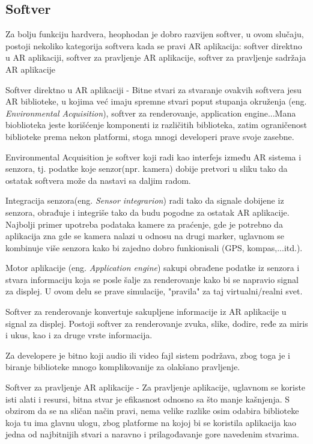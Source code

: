 \documentclass[a4paper]{article}
\begin{document}
	\subsection{Softver}
        \label{sec:Softver}
        Za bolju funkciju hardvera, heophodan je dobro razvijen softver, u ovom slučaju, postoji nekoliko kategorija softvera kada se pravi AR aplikacija: softver
	direktno u AR aplikaciji, softver za pravljenje AR aplikacije, softver za pravljenje sadržaja AR aplikacije
        
	Softver direktno u AR aplikaciji - Bitne stvari za stvaranje ovakvih softvera jesu AR biblioteke, u kojima već imaju spremne stvari poput stupanja okruženja
	(eng. \emph{Environmental Acquisition}), softver za renderovanje, application engine...Mana bioblioteka jeste korišćenje komponenti iz različitih biblioteka, zatim
	ograničenost biblioteke prema nekon platformi, stoga mnogi developeri prave svoje zasebne.

	Environmental Acquisition je softver koji radi kao interfejs između AR sistema i senzora, tj. podatke koje senzor(npr. kamera) dobije pretvori u sliku tako da
	ostatak softvera može da nastavi sa daljim radom.

	Integracija senzora(eng. \emph{Sensor integrarion}) radi tako da signale dobijene iz senzora, obrađuje i integriše tako da budu pogodne za ostatak AR 
	aplikacije. Najbolji primer upotreba podataka kamere za praćenje, gde je potrebno da aplikacija zna gde se kamera nalazi u odnosu na drugi marker, uglavnom se
	kombinuje više senzora kako bi zajedno dobro funkionisali (GPS, kompas,...itd.).

	Motor aplikacije (eng. \emph{Application engine}) sakupi obrađene podatke iz senzora i stvara informaciju koja se posle šalje za renderovanje kako bi se
	napravio signal za displej. U ovom delu se prave simulacije, "pravila" za taj virtualni/realni svet.

	Softver za renderovanje konvertuje sakupljene informacije iz AR aplikacije u signal za displej. Postoji softver za renderovanje zvuka, slike, dodire, ređe za
	miris i ukus, kao i za druge vrste informacija.

	Za developere je bitno koji audio ili video fajl sistem podržava, zbog toga je i biranje biblioteke mnogo komplikovanije za olakšano pravljenje.

	Softver za pravljenje AR aplikacije - Za pravljenje aplikacije, uglavnom se koriste isti alati i resursi, bitna stvar je efikasnost odnosno sa što manje 
	kašnjenja. S obzirom da se na sličan način pravi, nema velike razlike osim odabira biblioteke koja tu ima glavnu ulogu, zbog platforme na kojoj bi 
	se koristila aplikacija kao jedna od najbitnijih stvari a naravno i prilagođavanje gore navedenim stvarima.
\end{document}

